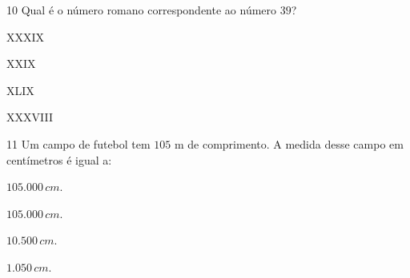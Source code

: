 
\num{10} Qual é o número romano correspondente ao número $39$?

\begin{escolha}
\item XXXIX 
\item XXIX 
\item XLIX 
\item XXXVIII
\end{escolha}



\num{11} Um campo de futebol tem $105$ m de comprimento. A medida desse campo em centímetros é igual a:

\begin{escolha}
\item $105.000\,cm$.
\item $105.000\,cm$.
\item $10.500\,cm$.
\item $1.050\,cm$.
\end{escolha}

